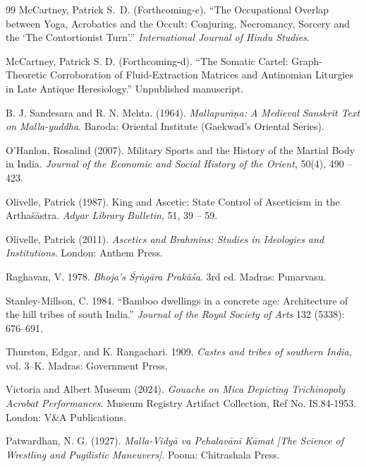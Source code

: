 \documentclass[11pt,twoside,letterpaper]{article}
\begin{document}
\begin{thebibliography}{99}
McCartney, Patrick S.~D. (Forthcoming-c). ``The Occupational Overlap between Yoga, Acrobatics and the Occult: Conjuring, Necromancy, Sorcery and the `The Contortionist Turn'.'' \textit{International Journal of Hindu Studies}.

McCartney, Patrick S. D. (Forthcoming-d). 
\newblock ``The Somatic Cartel: Graph-Theoretic Corroboration of Fluid-Extraction Matrices and Antinomian Liturgies in Late Antique Heresiology.'' 
\newblock Unpublished manuscript.

B. J. Sandesara and R. N. Mehta.  (1964). \textit{Mallapurāṇa: A Medieval Sanskrit Text on Malla-yuddha}. Baroda: Oriental Institute (Gaekwad's Oriental Series).

O'Hanlon, Rosalind (2007). Military Sports and the History of the Martial Body in India. \textit{Journal of the Economic and Social History of the Orient}, 50(4), 490 -- 423.

Olivelle, Patrick (1987). King and Ascetic: State Control of Asceticism in the Artha\v{s}āstra. \textit{Adyar Library Bulletin}, 51, 39 -- 59.

Olivelle, Patrick (2011). \textit{Ascetics and Brahmins: Studies in Ideologies and Institutions}. London: Anthem Press.

Raghavan, V. 1978. \textit{Bhoja's Śṛ\.{n}gāra Prakāśa}. 3rd ed. Madras: Punarvasu.

Stanley-Millson, C. 1984. ``Bamboo dwellings in a concrete age: Architecture of the hill tribes of south India.'' \textit{Journal of the Royal Society of Arts} 132 (5338): 676--691.

Thurston, Edgar, and K. Rangachari. 1909. \textit{Castes and tribes of southern India}, vol. 3--K. Madras: Government Press.

Victoria and Albert Museum (2024). \textit{Gouache on Mica Depicting Trichinopoly Acrobat Performances}. Museum Registry Artifact Collection, Ref No. IS.84-1953. London: V\&A Publications.

Patwardhan, N. G. (1927). \textit{Malla-Vidyā va Pehalavānī Kāmat [The Science of Wrestling and Pugilistic Maneuvers]}. Poona: Chitrashala Press.


\end{thebibliography}
\end{document}
